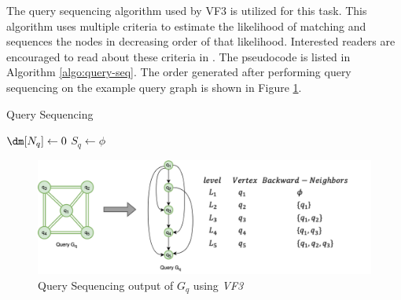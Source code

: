 The query sequencing algorithm used by VF3 \cite{VF3} is utilized for this task. This algorithm uses multiple criteria to estimate the likelihood of matching and sequences the nodes in decreasing order of that likelihood.
Interested readers are encouraged to read about these criteria in \cite{VF3}.
The pseudocode is listed in Algorithm \ref{algo:query-seq}.
The order generated after performing query sequencing on the example query graph is shown in Figure \ref{fig:query-sequencing}.

\begin{algorithm}[h]
    \caption{Query Sequencing}
    \label{algo:query-seq}



    $\dm[N_q] \leftarrow 0$\;
    $S_q \leftarrow \phi$\;
\end{algorithm}



\begin{figure}
    \includegraphics[width=\textwidth]{fig/LR/query-sequencing.png}
    \caption{Query Sequencing output of $G_q$ using \textit{VF3}}
    \label{fig:query-sequencing}
\end{figure}

